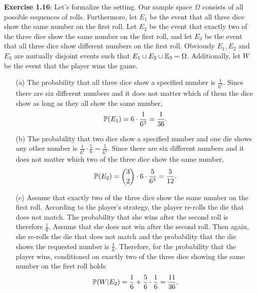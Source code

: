 \textbf{Exercise 1.16}: Let's formalize the setting. Our sample space $\Omega$
consists of all possible sequences of rolls. Furthermore, let $E_1$ be the event
that all three dice show the same number on the first roll. Let $E_2$ be the event
that exactly two of the three dice show the same number on the first roll, and let
$E_3$ be the event that all three dice show different numbers on the first roll.
Obviously $E_1, E_2$ and $E_3$ are mutually disjoint events such that
$E_1 \cup E_2 \cup \mathbb{E}_3 = \Omega$. Additionally, let $W$ be the event that the
player wins the game.
\begin{enumerate}
  \item[(a)] The probability that all three dice show a specified number is
    $\frac{1}{6^3}$. Since there are six different numbers and it does not matter
    which of them the dice show as long as they all show the same number,
    \[ \mathbb{P}(E_1) = 6 \cdot \frac{1}{6^3} = \frac{1}{36}.\]

  \item[(b)] The probability that two dice show a specified number and one die
    shows any other number is $\frac{1}{6^2} \cdot \frac{5}{6} = \frac{5}{6^3}$.
    Since there are six different numbers and it does not matter which two of the
    three dice show the same number,
    \[ \mathbb{P}(E_2) = \binom{3}{2} \cdot 6 \cdot \frac{5}{6^3} = \frac{5}{12}.\]

  \item[(c)] Assume that exactly two of the three dice show the same number on
    the first roll. According to the player's strategy, the player re-rolls the
    die that does not match. The probability that she wins after the second roll
    is therefore $\frac{1}{6}$. Assume that she does not win after the second roll.
    Then again, she re-rolls the die that does not match and the probability that
    the die shows the requested number is $\frac{1}{6}$. Therefore, for the
    probability that the player wins, conditioned on exactly two of the three dice
    showing the same number on the first roll holds
    \[ \mathbb{P}(W|E_2) =\frac{1}{6} + \frac{5}{6} \cdot \frac{1}{6} = \frac{11}{36}. \]


\end{enumerate}
